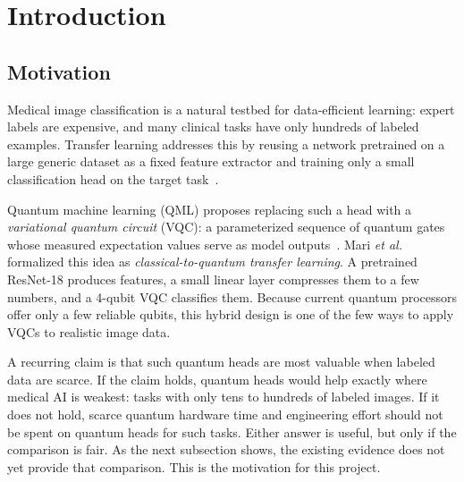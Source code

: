 \documentclass[conference]{IEEEtran}
\begin{document}
\section{Introduction}
\subsection{Motivation}
\label{sec:motivation}
Medical image classification is a natural testbed for data-efficient
learning: expert labels are expensive, and many clinical tasks have only
hundreds of labeled examples. Transfer learning addresses this by reusing a
network pretrained on a large generic dataset as a fixed feature extractor
and training only a small classification head on the target
task~\cite{he2016}.

Quantum machine learning (QML) proposes replacing such a head with a
\emph{variational quantum circuit} (VQC): a parameterized sequence of
quantum gates whose measured expectation values serve as model
outputs~\cite{cerezo2021}. Mari \emph{et al.}~\cite{mari2020} formalized this
idea as \emph{classical-to-quantum transfer learning}. A pretrained
ResNet-18 produces features, a small linear layer compresses them to a few
numbers, and a 4-qubit VQC classifies them. Because current quantum
processors offer only a few reliable qubits, this hybrid design is one of
the few ways to apply VQCs to realistic image data.

A recurring claim is that such quantum heads are most valuable when
labeled data are scarce. If the claim holds, quantum heads would help
exactly where medical AI is weakest: tasks with only tens to hundreds of
labeled images. If it does not hold, scarce quantum hardware time and
engineering effort should not be spent on quantum heads for such tasks.
Either answer is useful, but only if the comparison is fair. As the next
subsection shows, the existing evidence does not yet provide that
comparison. This is the motivation for this project.
\end{document}
